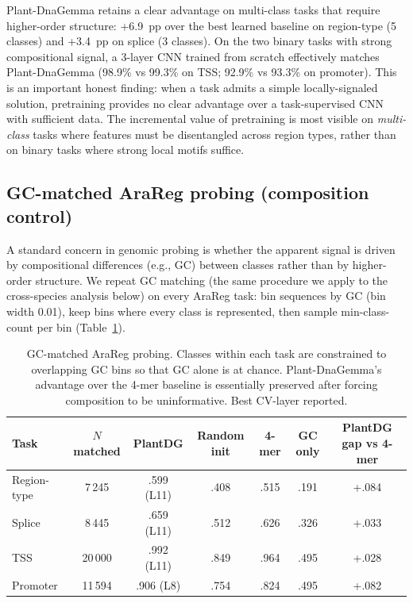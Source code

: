 \documentclass[11pt, a4paper]{article}
\begin{document}
Plant-DnaGemma retains a clear advantage on multi-class tasks that require
higher-order structure: +6.9~pp over the best learned baseline on
region-type (5 classes) and +3.4~pp on splice (3 classes). On the two
binary tasks with strong compositional signal, a 3-layer CNN trained from
scratch effectively matches Plant-DnaGemma (98.9\% vs 99.3\% on TSS;
92.9\% vs 93.3\% on promoter). This is an important honest finding: when
a task admits a simple locally-signaled solution, pretraining provides no
clear advantage over a task-supervised CNN with sufficient data. The
incremental value of pretraining is most visible on \emph{multi-class}
tasks where features must be disentangled across region types, rather
than on binary tasks where strong local motifs suffice.

\subsection*{GC-matched AraReg probing (composition control)}
\label{sec:gcmatched-arareg}

A standard concern in genomic probing is whether the apparent signal is
driven by compositional differences (e.g., GC) between classes rather
than by higher-order structure. We repeat GC matching (the same procedure
we apply to the cross-species analysis below) on every AraReg task: bin
sequences by GC (bin width 0.01), keep bins where every class is
represented, then sample min-class-count per bin
(Table~\ref{tab:arareg-gc-matched}).

\begin{table}[t]
\centering
\small
\caption{GC-matched AraReg probing. Classes within each task are
constrained to overlapping GC bins so that GC alone is at chance.
Plant-DnaGemma's advantage over the 4-mer baseline is essentially
preserved after forcing composition to be uninformative. Best CV-layer
reported.}
\label{tab:arareg-gc-matched}
\begin{tabular}{lcccccc}
\toprule
Task & $N$ matched & PlantDG & Random init & 4-mer & GC only & PlantDG gap vs 4-mer \\
\midrule
Region-type & 7\,245  & .599 (L11) & .408 & .515 & .191 & +.084 \\
Splice      & 8\,445  & .659 (L11) & .512 & .626 & .326 & +.033 \\
TSS         & 20\,000 & .992 (L11) & .849 & .964 & .495 & +.028 \\
Promoter    & 11\,594 & .906 (L8)  & .754 & .824 & .495 & +.082 \\
\bottomrule
\end{tabular}
\end{table}
\end{document}

